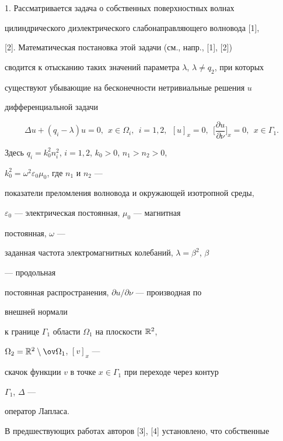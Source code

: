  


1. Рассматривается задача о собственных поверхностных волнах 


цилиндрического диэлектрического слабонаправляющего волновода [1], 


[2]. Математическая постановка этой задачи (см., напр., [1], [2]) 


сводится к отысканию таких значений параметра $\lambda$, $\lambda\ne 


q_2$, при которых 


существуют убывающие на бесконечности нетривиальные решения $u$ 


дифференциальной задачи 


\begin{equation} 


\Delta u+(q_i-\lambda)u=0,\ \ x\in\Omega_i,\ \ i=1,2,\ \ 


[u]_x=0,\ \ \bigg[\frac{\partial u}{\partial\nu} \bigg]_x=0, 


\ \ x\in\Gamma_1. 


\end{equation} 


Здесь $q_i=k^2_0n^2_i$, $i=1,2$, $k_0>0$, $n_1>n_2>0$, 


$k^2_0=\omega^2\varepsilon_0\mu_0$, где $n_1$ и $n_2$ --- 


показатели преломления волновода и окружающей изотропной среды, 


$\varepsilon_0$ --- электрическая постоянная, $\mu_0$ --- магнитная 


постоянная, $\omega$ --- 


заданная частота электромагнитных колебаний, $\lambda=\beta^2$, $\beta$ 


--- продольная 


постоянная распространения, $\partial u/\partial\nu$ --- производная по 


внешней нормали 


к границе $\Gamma_1$ области $\Omega_1$ на плоскости $\Bbb R^2$, 


$\Omega_2=\Bbb R^2\setminus\ov\Omega_1$, $[v]_x$ --- 


скачок функции $v$ в точке $x\in\Gamma_1$ при переходе через контур 


$\Gamma_1$, $\Delta$ --- 


оператор Лапласа. 


 


В предшествующих работах авторов [3], [4] установлено, что собственные 


